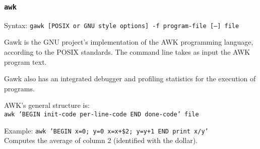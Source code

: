 \subsubsection{\texttt{awk}}
Syntax: \texttt{gawk [POSIX or GNU style options] -f program-file [--] file}

Gawk is the GNU project's implementation of the AWK programming language, according to the POSIX standards. The command line takes as input the AWK program text.

Gawk also has an integrated debugger and profiling statistics for the execution of programs.

AWK's general structure is: \\
\texttt{awk 'BEGIN {init-code} {per-line-code} END {done-code}' file}

Example: \texttt{awk 'BEGIN {x=0; y=0} {x=x+\$2; y=y+1} END {print x/y}'} \\
Computes the average of column 2 (identified with the dollar).
